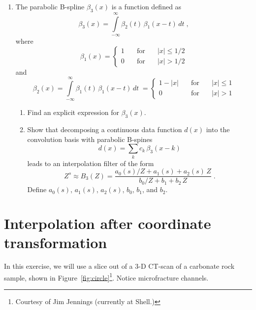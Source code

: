 \begin{enumerate}
\item The parabolic B-spline $\beta_3(x)$ is a function defined as
 \begin{equation}
   \label{eq:b3} 
   \beta_3(x) = \int\limits_{-\infty}^{\infty} \beta_2(t)\,\beta_1(x-t)\,d t\;,
\end{equation}
where
\begin{equation}
   \label{eq:b1}
   \beta_1(x) = \left\{\begin{array}{lcl} 1 & \quad\mbox{for}\quad & |x| \le 1/2 \\
       0 &\quad \mbox{for}\quad& |x| > 1/2\end{array}\right.
 \end{equation}
and
\begin{equation}
  \label{eq:b2} 
   \beta_2(x) = \int\limits_{-\infty}^{\infty} \beta_1(t)\,\beta_1(x-t)\,d t\;
   = \left\{\begin{array}{lcl} 1-|x| &\quad \mbox{for}\quad& |x| \le 1 \\
       0 & \quad \mbox{for}\quad&  |x| > 1\end{array}\right.
\end{equation}

\begin{enumerate}
\item Find an explicit expression for $\beta_3(x)$.
\item Show that decomposing a continuous data function $d(x)$ into the convolution basis 
  with parabolic B-spines
  \begin{equation}
    \label{eq:basis} 
    d(x) = \sum\limits_k c_k\,\beta_3(x-k)
  \end{equation}
  leads to an interpolation filter of the form
  \begin{equation}
    \label{eq:bz}
    Z^s \approx B_3(Z) = \frac{a_0(s)/Z + a_1(s) + a_2(s)\,Z}{b_0/Z + b_1 + b_2\,Z}\;.
  \end{equation}
  Define $a_0(s)$, $a_1(s)$, $a_2(s)$, $b_0$, $b_1$, and $b_2$.
\end{enumerate}

\end{enumerate}

\section{Interpolation after coordinate transformation}

In this exercise, we will use a slice out of a 3-D CT-scan of a
carbonate rock sample, shown in
Figure~\ref{fig:circle}\footnote{Courtesy of Jim Jennings
  (currently at Shell.)}. Notice microfracture channels.

